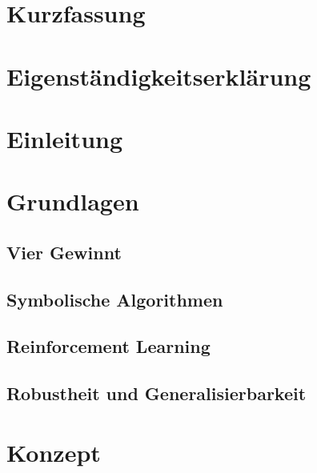 \documentclass[a4paper, 12pt]{scrartcl}
\begin{document}
    \renewcommand{\figurename}{Abb.}
	\fancyhf{}
	
	\newpage
	
	\section{Kurzfassung}
	
	
	\tableofcontents
	\newpage

    \listoffigures
    \newpage

    \section*{Eigenständigkeitserklärung}
	
	\newpage
 
	\setcounter{page}{1}
	\fancyfoot[C]{\thepage}
	
	\section{Einleitung}
	
	
	\section{Grundlagen}
    
    
    \subsection{Vier Gewinnt}
    
    
	\subsection{Symbolische Algorithmen}
	

	\subsection{Reinforcement Learning}
	

	\subsection{Robustheit und Generalisierbarkeit}
	
	
    \section{Konzept}
    
    
\end{document}
